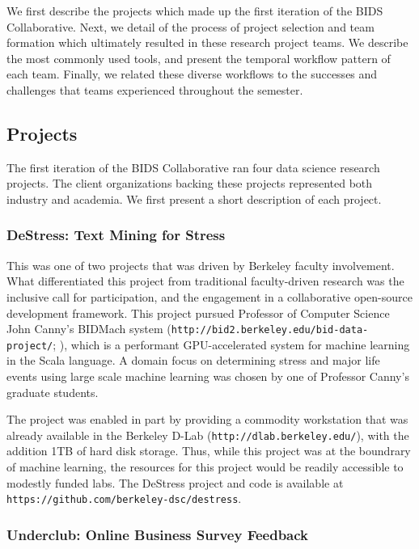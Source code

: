 \documentclass[12pt]{article}
\begin{document}
We first describe the projects which made up the first iteration of the BIDS Collaborative.  Next, we detail of the process of project selection and team formation which ultimately resulted in these research project teams.  We describe the most commonly used tools, and present the temporal workflow pattern of each team.  Finally, we related these diverse workflows to the successes and challenges that teams experienced throughout the semester.

\subsection{Projects}

The first iteration of the BIDS Collaborative ran four data science research projects.  The client organizations backing these projects represented both industry and academia.  We first present a short description of each project.

\subsubsection*{DeStress: Text Mining for Stress}

This was one of two projects that was driven by Berkeley faculty involvement. What differentiated this project from traditional faculty-driven research was the inclusive call for participation, and the engagement in a collaborative open-source development framework. This project pursued Professor of Computer Science John Canny's BIDMach system (\texttt{http://bid2.berkeley.edu/bid-data-project/}; \cite{canny2013bidmach}), which is a performant GPU-accelerated system for machine learning in the Scala language. A domain focus on determining stress and major life events using large scale machine learning was chosen by one of Professor Canny's graduate students.

The project was enabled in part by providing a commodity workstation that was already available in the Berkeley D-Lab (\texttt{http://dlab.berkeley.edu/}), with the addition 1TB of hard disk storage. Thus, while this project was at the boundrary of machine learning, the resources for this project would be readily accessible to modestly funded labs.  The DeStress project and code is available at \texttt{https://github.com/berkeley-dsc/destress}.

\subsubsection*{Underclub: Online Business Survey Feedback}
\end{document}
